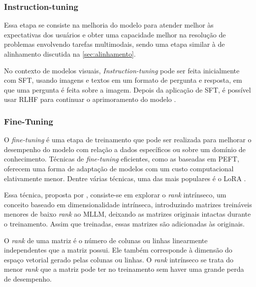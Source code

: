 \subsubsection{Instruction-tuning}

Essa etapa se consiste na melhoria do modelo para atender melhor às expectativas dos usuários e obter uma capacidade melhor na resolução de problemas envolvendo tarefas
multimodais, sendo uma etapa similar à de alinhamento discutida na \autoref{sec:alinhamento}.

No contexto de modelos visuais, \textit{Instruction-tuning} pode ser feita inicialmente com \ac{SFT}, usando imagens e textos em um formato de pergunta e resposta, em
que uma pergunta é feita sobre a imagem. Depois da aplicação de \ac{SFT}, é possível usar \ac{RLHF} para continuar o aprimoramento do modelo \cite{mllm_survey_2024}.

\subsubsection{Fine-Tuning}

O \textit{fine-tuning} é uma etapa de treinamento que pode ser realizada para melhorar o desempenho do modelo com relação a dados específicos ou sobre um domínio de
conhecimento. Técnicas de \textit{fine-tuning} eficientes, como as baseadas em \ac{PEFT}, oferecem uma forma de adaptação de modelos com um custo computacional
elativamente menor. Dentre várias técnicas, uma das mais populares é o \ac{LoRA} \cite{llm_survey_2023}.


Essa técnica, proposta por \textcite{hu2021lora}, consiste-se em explorar o \textit{rank} intrínseco, um conceito baseado em dimensionalidade intrínseca, introduzindo
matrizes treináveis menores de baixo \textit{rank} ao \ac{MLLM}, deixando as matrizes originais intactas durante o treinamento. Assim que treinadas, essas matrizes são
adicionadas às originais.

O \textit{rank} de uma matriz é o número de colunas ou linhas linearmente independentes que a matriz possui. Ele também corresponde à dimensão do espaço vetorial
gerado pelas colunas ou linhas. O \textit{rank} intrínseco se trata do menor \textit{rank} que a matriz pode ter no treinamento sem haver uma grande perda de desempenho.

